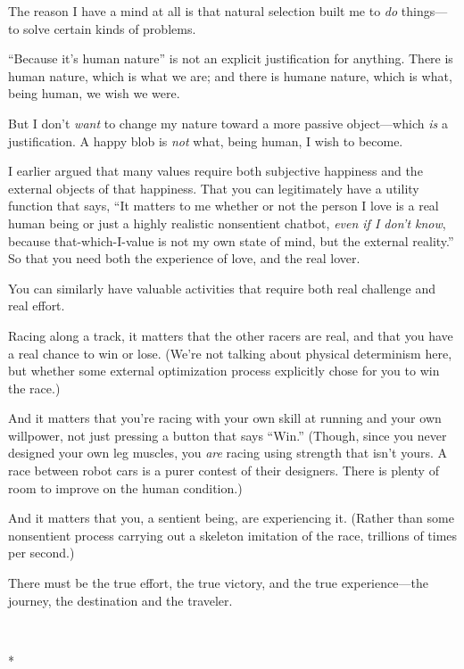 {
 The reason I have a mind at all is that natural selection built me
to \textit{do} things---to solve certain kinds of problems.}

{
 ``Because it's human
nature'' is not an explicit justification for
anything. There is human nature, which is what we are; and there is
humane nature, which is what, being human, we wish we were.}

{
 But I don't \textit{want} to change my nature
toward a more passive object---which \textit{is} a justification. A
happy blob is \textit{not} what, being human, I wish to become.}

{
 I earlier argued that many values require both subjective
happiness and the external objects of that happiness. That you can
legitimately have a utility function that says, ``It
matters to me whether or not the person I love is a real human being or
just a highly realistic nonsentient chatbot, \textit{even if I
don't know}, because that-which-I-value is not my own
state of mind, but the external reality.'' So that
you need both the experience of love, and the real lover.}

{
 You can similarly have valuable activities that require both real
challenge and real effort.}

{
 Racing along a track, it matters that the other racers are real,
and that you have a real chance to win or lose. (We're
not talking about physical determinism here, but whether some external
optimization process explicitly chose for you to win the race.)}

{
 And it matters that you're racing with your own
skill at running and your own willpower, not just pressing a button
that says ``Win.'' (Though, since
you never designed your own leg muscles, you \textit{are} racing using
strength that isn't yours. A race between robot cars is
a purer contest of their designers. There is plenty of room to improve
on the human condition.)}

{
 And it matters that you, a sentient being, are experiencing it.
(Rather than some nonsentient process carrying out a skeleton imitation
of the race, trillions of times per second.)}

{
 There must be the true effort, the true victory, and the true
experience---the journey, the destination and the traveler.}

{\centering
 \ ~
\par}

{\centering
 *
\par}

